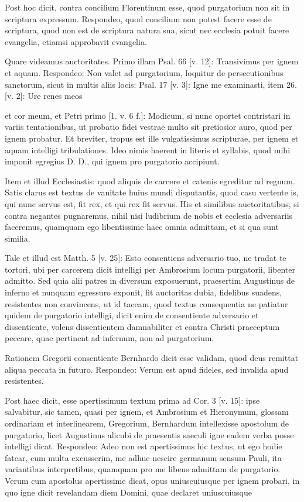 Post hoc dicit, contra concilium Florentinum esse, quod purgatorium non sit in scriptura expressum. Respondeo, quod concilium non potest facere esse de scriptura, quod non est de scriptura natura sua, sicut nec ecclesia potuit facere evangelia, etiamsi approbavit evangelia.

Quare videamus auctoritates. Primo illam Psal. 66 [v. 12]: Transivimus per ignem et aquam. Respondeo: Non valet ad purgatorium, loquitur de persecutionibus sanctorum, sicut in multis aliis locis: Psal. 17 [v. 3]: Igne me examinasti, item 26. [v. 2]: Ure renes meos

et cor meum, et Petri primo [1. v. 6 f.]: Modicum, si nunc oportet contristari in variis \marginpar{\small[330]} tentationibus, ut probatio fidei vestrae multo sit pretiosior auro, quod per ignem probatur. Et breviter, tropus est ille vulgatissimus scripturae, per ignem et aquam intelligi tribulationes. Ideo nimis haerent in literis et syllabis, quod mihi imponit egregius D. D., qui ignem pro purgatorio accipiunt.

Item et illud Ecclesiastis: quod aliquis de carcere et catenis egreditur ad regnum. Satis clarus est textus de vanitate huius mundi disputantis, quod casu vertente is, qui nunc servus est, fit rex, et qui rex fit servus. His et similibus auctoritatibus, si contra negantes pugnaremus, nihil nisi ludibrium de nobis et ecclesia adversariis faceremus, quamquam ego libentissime haec omnia admittam, et si qua sunt similia.

Tale et illud est Matth. 5 [v. 25]: Esto consentiens adversario tuo, ne tradat te tortori, ubi per carcerem dicit intelligi per Ambrosium locum purgatorii, libenter admitto. Sed quia alii patres in diversum exposuerunt, praesertim Augustinus de inferno et nunquam egressuro exponit, fit auctoritas dubia, fidelibus suadens, resistentes non convincens, ut id taceam, quod textus consequentia ne patiatur quidem de purgatorio intelligi, dicit enim de consentiente adversario et dissentiente, volens dissentientem damnabiliter et contra Christi praeceptum peccare, quae pertinent ad infernum, non ad purgatorium.

Rationem Gregorii consentiente Bernhardo dicit esse validam, quod deus remittat aliqua peccata in futuro. Respondeo: Verum est apud fideles, sed invalida apud resistentes.

Post haec dicit, esse apertissimum textum prima ad Cor. 3 [v. 15]: ipse salvabitur, sic tamen, quasi per ignem, et Ambrosium et Hieronymum, glossam ordinariam et interlinearem, Gregorium, Bernhardum intellexisse apostolum de purgatorio, licet Augustinus alicubi de praesentis saeculi igne eadem verba posse intelligi dicat. Respondeo: Adeo non est apertissimus hic textus, ut ego hodie fatear, cum multa excusserim, me adhuc nescire germanum sensum Pauli, ita variantibus interpretibus, quamquam pro me libens admittam de purgatorio. Verum cum apostolus apertissime dicat, opus uniuscuiusque per ignem probari, in quo igne dicit revelandam diem Domini, quae declaret uniuscuiusque

